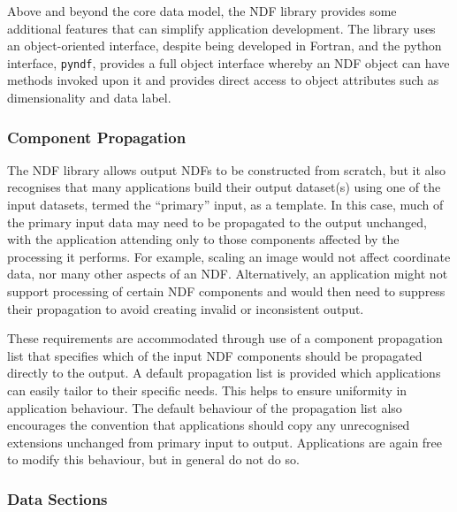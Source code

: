 \documentclass[final,authoryear,5p,times,twocolumn]{elsarticle}
\begin{document}
Above and beyond the core data model, the NDF library provides some
additional features that can simplify application development. The
library uses an object-oriented interface, despite being
developed in Fortran, and the python interface, \texttt{pyndf}, provides a full object
interface whereby an NDF object can have methods invoked upon it and
provides direct access to object attributes such as dimensionality and
data label.

\subsubsection{Component Propagation}

The NDF library allows output NDFs to be constructed from scratch, but
it also recognises that many applications build their output dataset(s)
using one of the input datasets, termed the ``primary'' input, as a
template. In this case, much of the primary input data may need to be
propagated to the output unchanged, with the application attending only
to those components affected by the processing it performs. For example,
scaling an image would not affect coordinate data, nor many other
aspects of an NDF. Alternatively, an application might not support
processing of certain NDF components and would then need to suppress
their propagation to avoid creating invalid or inconsistent output.

These requirements are accommodated through use of a component
propagation list that specifies which of the input NDF components should
be propagated directly to the output. A default propagation list is
provided which applications can easily tailor to their specific needs.
This helps to ensure uniformity in application behaviour. The default
behaviour of the propagation list also encourages the convention that
applications should copy any unrecognised extensions unchanged from
primary input to output. Applications are again free to modify this
behaviour, but in general do not do so.

\subsubsection{Data Sections}
\end{document}
